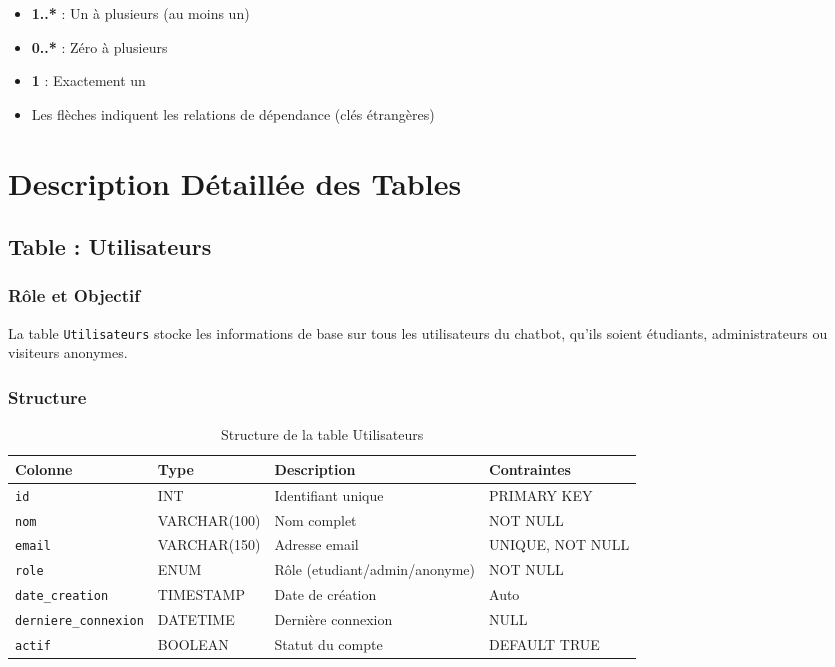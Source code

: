 \documentclass[11pt,a4paper]{article}
\begin{document}
\begin{info}
\begin{itemize}
    \item \textbf{1..*} : Un à plusieurs (au moins un)
    \item \textbf{0..*} : Zéro à plusieurs
    \item \textbf{1} : Exactement un
    \item Les flèches indiquent les relations de dépendance (clés étrangères)
\end{itemize}
\end{info}

\clearpage

\section{Description Détaillée des Tables}
\label{sec:tables}

\subsection{Table : Utilisateurs}

\subsubsection{Rôle et Objectif}

La table \texttt{Utilisateurs} stocke les informations de base sur tous les utilisateurs du chatbot, qu'ils soient étudiants, administrateurs ou visiteurs anonymes.

\subsubsection{Structure}

\begin{table}[H]
\centering
\small
\begin{tabular}{|l|l|l|l|}
\hline
\textbf{Colonne} & \textbf{Type} & \textbf{Description} & \textbf{Contraintes} \\
\hline
\texttt{id} & INT & Identifiant unique & PRIMARY KEY \\
\hline
\texttt{nom} & VARCHAR(100) & Nom complet & NOT NULL \\
\hline
\texttt{email} & VARCHAR(150) & Adresse email & UNIQUE, NOT NULL \\
\hline
\texttt{role} & ENUM & Rôle (etudiant/admin/anonyme) & NOT NULL \\
\hline
\texttt{date\_creation} & TIMESTAMP & Date de création & Auto \\
\hline
\texttt{derniere\_connexion} & DATETIME & Dernière connexion & NULL \\
\hline
\texttt{actif} & BOOLEAN & Statut du compte & DEFAULT TRUE \\
\hline
\end{tabular}
\caption{Structure de la table Utilisateurs}
\end{table}
\end{document}
